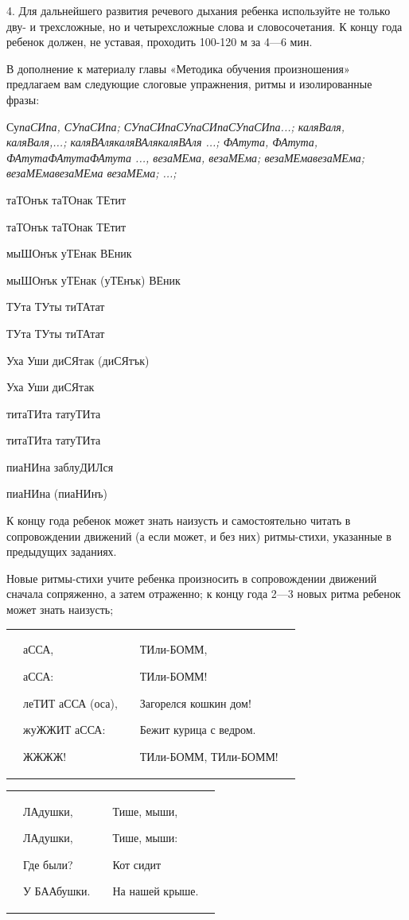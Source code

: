 \documentclass[a5paper]{book}
\renewcommand{\emph}[1]{\textit{#1}}
\begin{document}
4. Для дальнейшего развития речевого дыхания ребенка используйте не
только дву- и трехсложные, но и четырехсложные слова и словосочетания. К
концу года ребенок должен, не уставая, проходить 100-120 м за 4---6 мин.

В дополнение к материалу главы «Методика обучения произношения»
предлагаем вам следующие слоговые упражнения, ритмы и изолированные
фразы:

Су\emph{паСИпа, СУпаСИпа; СУпаСИпаСУпаСИпаСУпаСИпа...; каляВаля,
каляВаля,...; каляВАлякаляВАлякаляВАля ...; ФАтута, ФАтута,
ФАтутаФАтутаФАтута ..., везаМЕма, везаМЕма; везаМЕмавезаМЕма;
везаМЕмавезаМЕма везаМЕма; ...;}

таТОнък таТОнак ТЕтит

таТОнък таТОнак ТЕтит

мыШОнък уТЕнак ВЕник

мыШОнък уТЕнак (уТЕнък) ВЕник

ТУта ТУты тиТАтат

ТУта ТУты тиТАтат

Уха Уши диСЯтак (диСЯтък)

Уха Уши диСЯтак

титаТИта татуТИта

титаТИта татуТИта

пиаНИна заблуДИЛся

пиаНИна (пиаНИнъ)

К концу года ребенок может знать наизусть и самостоятельно читать в
сопровождении движений (а если может, и без них) ритмы-стихи, указанные
в предыдущих заданиях.

Новые ритмы-стихи учите ребенка произносить в сопровождении движений
сначала сопряженно, а затем отраженно; к концу года 2---3 новых ритма
ребенок может знать наизусть;
{ \centering
\begin{tabular}{p{}p{}p{}p{}p{}}
&аССА, 

аССА: 

леТИТ аССА (оса),

жуЖЖИТ аССА:

ЖЖЖЖ! &&

ТИли-БОММ,

ТИли-БОММ!

Загорелся кошкин дом!

Бежит курица с ведром.

ТИли-БОММ, ТИли-БОММ!&
\end{tabular}
}

{ \centering
\begin{tabular}{p{}p{}p{}p{}p{}}&
ЛАдушки,

ЛАдушки,

Где были?

У БААбушки.&&

Тише, мыши,

Тише, мыши:
 
Кот сидит

На нашей крыше.&
\end{tabular}
}
\end{document}
